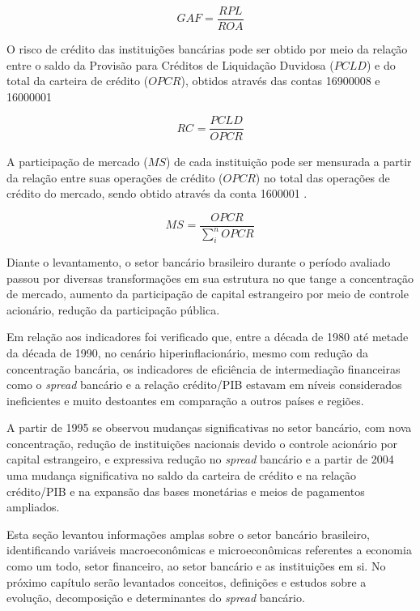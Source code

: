 \documentclass[
  12pt,
  12pt,
  openright,
  oneside,
  a4paper,
  chapter=TITLE,
  section=TITLE,
  subsection=TITLE,
  subsubsection=TITLE,
  english,
  portugues,
  sumario=tradicional]{abntex2}
\begin{document}
\begin{equation}
GAF = \frac{RPL}{ROA}
\end{equation}

O risco de crédito das instituições bancárias pode ser obtido por meio da relação entre o saldo da Provisão para Créditos de Liquidação Duvidosa (\(PCLD\)) e do total da carteira de crédito (\(OPCR\)), obtidos através das contas 16900008 e 16000001 \cite{dantas:2012}

\begin{equation}
RC_{} = \frac{PCLD_{}}{OPCR_{}}
\end{equation}

A participação de mercado (\(MS\)) de cada instituição pode ser mensurada a partir da relação entre suas operações de crédito (\(OPCR\)) no total das operações de crédito do mercado, sendo obtido através da conta 1600001 \cite{dantas:2012}.

\begin{equation}
MS_{} = \frac{OPCR_{}}{\sum_{i}^{n}OPCR_{}} 
\end{equation}

Diante o levantamento, o setor bancário brasileiro durante o período avaliado passou por diversas transformações em sua estrutura no que tange a concentração de mercado, aumento da participação de capital estrangeiro por meio de controle acionário, redução da participação pública.

Em relação aos indicadores foi verificado que, entre a década de 1980 até metade da década de 1990, no cenário hiperinflacionário, mesmo com redução da concentração bancária, os indicadores de eficiência de intermediação financeiras como o \emph{spread} bancário e a relação crédito/PIB estavam em níveis considerados ineficientes e muito destoantes em comparação a outros países e regiões.

A partir de 1995 se observou mudanças significativas no setor bancário, com nova concentração, redução de instituições nacionais devido o controle acionário por capital estrangeiro, e expressiva redução no \emph{spread} bancário e a partir de 2004 uma mudança significativa no saldo da carteira de crédito e na relação crédito/PIB e na expansão das bases monetárias e meios de pagamentos ampliados.

Esta seção levantou informações amplas sobre o setor bancário brasileiro, identificando variáveis macroeconômicas e microeconômicas referentes a economia como um todo, setor financeiro, ao setor bancário e as instituições em si. No próximo capítulo serão levantados conceitos, definições e estudos sobre a evolução, decomposição e determinantes do \emph{spread} bancário.
\end{document}

